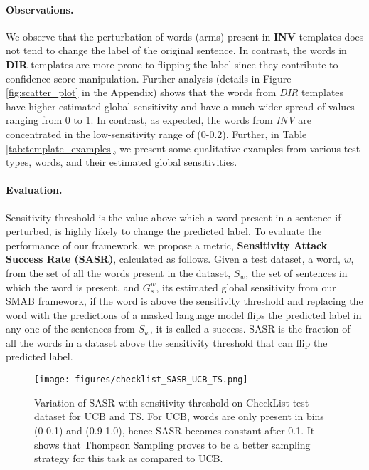 \paragraph{Observations.} We observe that the perturbation of words (arms) present in \textbf{INV} templates does not tend to change the label of the original sentence. In contrast, the words in \textbf{DIR} templates are more prone to flipping the label since they contribute to confidence score manipulation. Further analysis (details in Figure \ref{fig:scatter_plot} in the Appendix) shows that the words from \textit{DIR} templates have higher estimated global sensitivity and have a much wider spread of values ranging from 0 to 1. In contrast, as expected, the words from \textit{INV} are concentrated in the low-sensitivity range of (0-0.2).
Further, in Table \ref{tab:template_examples}, we present some qualitative examples from various test types, words, and their estimated global sensitivities.

\paragraph{Evaluation.} Sensitivity threshold is the value above which a word present in a sentence if perturbed, is highly likely to change the predicted label. To evaluate the performance of our framework, we propose a metric, \textbf{Sensitivity Attack Success Rate (SASR)}, calculated as follows. Given a test dataset, a word, $w$, from the set of all the words present in the dataset, $S_w$, the set of sentences in which the word is present,   and $G_s^w$, its estimated global sensitivity from our SMAB framework, if the word is above the sensitivity threshold and replacing the word with the predictions of a masked language model flips the predicted label in any one of the sentences from $S_w$, it is called a success. SASR is the fraction of all the words in a dataset above the sensitivity threshold that can flip the predicted label.

\begin{figure}[t]
    \texttt{[image: figures/checklist\_SASR\_UCB\_TS.png]}
    \caption{Variation of SASR with sensitivity threshold on CheckList test dataset for UCB and TS. For UCB, words are only present in bins (0-0.1) and (0.9-1.0), hence SASR becomes constant after 0.1. It shows that Thompson Sampling proves to be a better sampling strategy for this task as compared to UCB.}
    \label{fig:checklist_SASR}
\end{figure}

